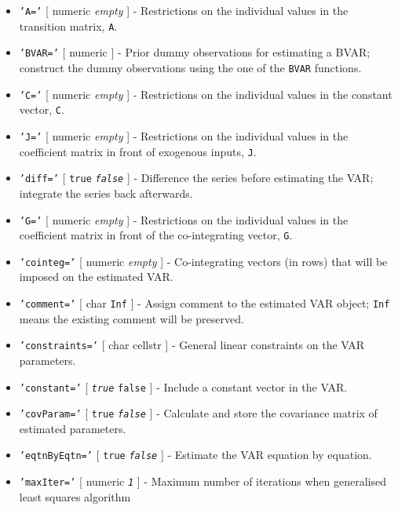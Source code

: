  \begin{itemize}
 \item
   \texttt{'A='} {[} numeric \textbar{} \emph{empty} {]} - Restrictions
   on the individual values in the transition matrix, \texttt{A}.
 \item
   \texttt{'BVAR='} {[} numeric {]} - Prior dummy observations for
   estimating a BVAR; construct the dummy observations using the one of
   the \texttt{BVAR} functions.
 \item
   \texttt{'C='} {[} numeric \textbar{} \emph{empty} {]} - Restrictions
   on the individual values in the constant vector, \texttt{C}.
 \item
   \texttt{'J='} {[} numeric \textbar{} \emph{empty} {]} - Restrictions
   on the individual values in the coefficient matrix in front of
   exogenous inputs, \texttt{J}.
 \item
   \texttt{'diff='} {[} \texttt{true} \textbar{} \emph{\texttt{false}}
   {]} - Difference the series before estimating the VAR; integrate the
   series back afterwards.
 \item
   \texttt{'G='} {[} numeric \textbar{} \emph{empty} {]} - Restrictions
   on the individual values in the coefficient matrix in front of the
   co-integrating vector, \texttt{G}.
 \item
   \texttt{'cointeg='} {[} numeric \textbar{} \emph{empty} {]} -
   Co-integrating vectors (in rows) that will be imposed on the estimated
   VAR.
 \item
   \texttt{'comment='} {[} char \textbar{} \texttt{Inf} {]} - Assign
   comment to the estimated VAR object; \texttt{Inf} means the existing
   comment will be preserved.
 \item
   \texttt{'constraints='} {[} char \textbar{} cellstr {]} - General
   linear constraints on the VAR parameters.
 \item
   \texttt{'constant='} {[} \emph{\texttt{true}} \textbar{}
   \texttt{false} {]} - Include a constant vector in the VAR.
 \item
   \texttt{'covParam='} {[} \texttt{true} \textbar{}
   \emph{\texttt{false}} {]} - Calculate and store the covariance matrix
   of estimated parameters.
 \item
   \texttt{'eqtnByEqtn='} {[} \texttt{true} \textbar{}
   \emph{\texttt{false}} {]} - Estimate the VAR equation by equation.
 \item
   \texttt{'maxIter='} {[} numeric \textbar{} \emph{\texttt{1}} {]} -
   Maximum number of iterations when generalised least squares algorithm

\end{itemize}
